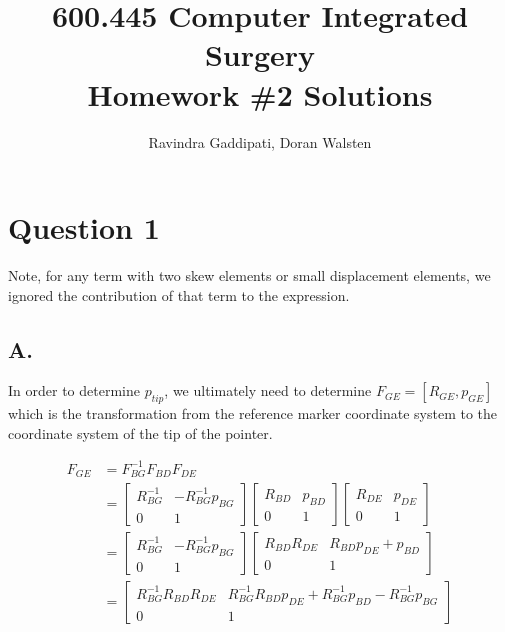 \documentclass[letterpaper, 11pt]{article}
\begin{document}
\title{600.445 Computer Integrated Surgery \\ Homework \#2 Solutions}
\author{Ravindra Gaddipati, Doran Walsten}
\maketitle

\pagebreak
\section*{Question 1}
Note, for any term with two skew elements or small displacement elements, we ignored the contribution of that term to the expression.
\subsection*{A.}
In order to determine $p_{tip}$, we ultimately need to determine $F_{GE} = [R_{GE},p_{GE}]$ which is the transformation from the reference marker coordinate system to the coordinate system of the tip of the pointer.

\begin{align}
    F_{GE} &= F_{BG}^{-1} F_{BD} F_{DE} \\
    &= 
    \begin{bmatrix}
        R_{BG}^{-1} & -R_{BG}^{-1}p_{BG}\\
        0 & 1 
    \end{bmatrix}
    \begin{bmatrix}
        R_{BD} & p_{BD}\\
        0 & 1 
    \end{bmatrix}
    \begin{bmatrix}
        R_{DE} & p_{DE}\\
        0 & 1 
    \end{bmatrix}\\
    &=
    \begin{bmatrix}
        R_{BG}^{-1} & -R_{BG}^{-1}p_{BG}\\
        0 & 1 
    \end{bmatrix}
    \begin{bmatrix}
        R_{BD}R_{DE} & R_{BD}p_{DE} + p_{BD}\\
        0 & 1 
    \end{bmatrix}\\
    &=
    \begin{bmatrix}
        R_{BG}^{-1}R_{BD}R_{DE} & R_{BG}^{-1}R_{BD}p_{DE} + R_{BG}^{-1}p_{BD}-R_{BG}^{-1}p_{BG}\\
        0 & 1 
    \end{bmatrix}\\
\end{align}
\end{document}
